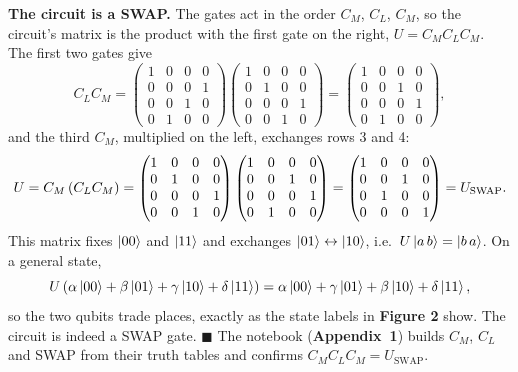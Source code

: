 \documentclass[a4paper, 10pt]{article}
\begin{document}
\begin{solution}
	\noindent \textbf{The circuit is a SWAP.} The gates act in the order \( C_M \), \( C_L \), \( C_M \), so the circuit's matrix is the product with the first gate on the right, \( U = C_M C_L C_M \).
	The first two gates give
	\[
		C_L C_M
		= \begin{pmatrix}
			1 & 0 & 0 & 0 \\ 0 & 0 & 0 & 1 \\ 0 & 0 & 1 & 0 \\ 0 & 1 & 0 & 0
		\end{pmatrix}
		\begin{pmatrix}
			1 & 0 & 0 & 0 \\ 0 & 1 & 0 & 0 \\ 0 & 0 & 0 & 1 \\ 0 & 0 & 1 & 0
		\end{pmatrix}
		= \begin{pmatrix}
			1 & 0 & 0 & 0 \\ 0 & 0 & 1 & 0 \\ 0 & 0 & 0 & 1 \\ 0 & 1 & 0 & 0
		\end{pmatrix},
	\]
	and the third \( C_M \), multiplied on the left, exchanges rows 3 and 4:
	\[
		U = C_M \left(C_L C_M\right)
		= \begin{pmatrix}
			1 & 0 & 0 & 0 \\ 0 & 1 & 0 & 0 \\ 0 & 0 & 0 & 1 \\ 0 & 0 & 1 & 0
		\end{pmatrix}
		\begin{pmatrix}
			1 & 0 & 0 & 0 \\ 0 & 0 & 1 & 0 \\ 0 & 0 & 0 & 1 \\ 0 & 1 & 0 & 0
		\end{pmatrix}
		= \begin{pmatrix}
			1 & 0 & 0 & 0 \\ 0 & 0 & 1 & 0 \\ 0 & 1 & 0 & 0 \\ 0 & 0 & 0 & 1
		\end{pmatrix}
		= U_{\text{SWAP}} .
	\]
	This matrix fixes \( \ket{00} \) and \( \ket{11} \) and exchanges \( \ket{01} \leftrightarrow \ket{10} \), i.e.\ \( U\ket{a\,b} = \ket{b\,a} \). On a general state,
	\[
		U\left(\alpha\ket{00} + \beta\ket{01} + \gamma\ket{10} + \delta\ket{11}\right)
		= \alpha\ket{00} + \gamma\ket{01} + \beta\ket{10} + \delta\ket{11},
	\]
	so the two qubits trade places, exactly as the state labels in \textbf{Figure 2} show. The circuit is indeed a SWAP gate. \( \blacksquare \)
	The notebook (\textbf{Appendix~1}) builds \( C_M \), \( C_L \) and SWAP from their truth tables and confirms \( C_M C_L C_M = U_{\text{SWAP}} \).
\end{solution}
\end{document}
